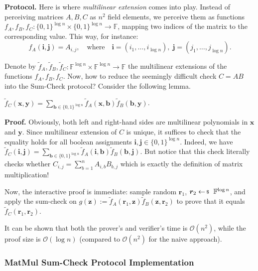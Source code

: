 \documentclass[../../book.tex]{subfiles}
\begin{document}
\textbf{Protocol.} Here is where \textit{multilinear extension} comes into play.
Instead of perceiving matrices $A,B,C$ as $n^2$ field elements, we perceive 
them as functions $f_A, f_B, f_C: \{0,1\}^{\log n} \times \{0,1\}^{\log n} \to \mathbb{F}$,
mapping two indices of the matrix to the corresponding value. This way, for instance:
\begin{equation*}
    f_A(\boldsymbol{i}, \boldsymbol{j}) = A_{i,j}, \quad \text{where} \quad \boldsymbol{i}=(i_1,\dots,i_{\log n}), \; \boldsymbol{j}=(j_1,\dots,j_{\log n}).
\end{equation*}

Denote by $\widetilde{f}_A, \widetilde{f}_B, \widetilde{f}_C: \mathbb{F}^{\log n} \times \mathbb{F}^{\log n} \to \mathbb{F}$ the
multilinear extensions of the functions $f_A, f_B, f_C$. Now, how to 
reduce the seemingly difficult check $C = AB$ into the Sum-Check
protocol? Consider the following lemma.
\begin{lemma}
    $\widetilde{f}_C(\mathbf{x},\mathbf{y}) = \sum_{\boldsymbol{b} \in \{0,1\}^{\log n}} \widetilde{f}_A(\mathbf{x}, \boldsymbol{b})\widetilde{f}_B(\boldsymbol{b}, \mathbf{y})$.
\end{lemma}

\textbf{Proof.} Obviously, both left and right-hand sides are multilinear
polynomials in $\mathbf{x}$ and $\mathbf{y}$. Since multilinear extension of $C$
is unique, it suffices to check that the equality holds for all boolean
assignments $\boldsymbol{i}, \boldsymbol{j} \in \{0,1\}^{\log n}$. Indeed, we
have $\widetilde{f}_C(\boldsymbol{i},\boldsymbol{j}) = \sum_{\boldsymbol{b} \in
\{0,1\}^{\log n}} \widetilde{f}_A(\boldsymbol{i},
\boldsymbol{b})\widetilde{f}_B(\boldsymbol{b}, \boldsymbol{j})$. But notice that
this check literally checks whether $C_{i,j} = \sum_{b=1}^n A_{i,b}B_{b,j}$
which is exactly the definition of matrix multiplication!

Now, the interactive proof is immediate: sample random $\boldsymbol{r}_1$,
$\boldsymbol{r}_2 \leftarrowS \mathbb{F}^{\log n}$, and apply the sum-check
on $g(\mathbf{z}) := \widetilde{f}_A(\boldsymbol{r}_1,
\mathbf{z})\widetilde{f}_B(\mathbf{z}, \boldsymbol{r}_2)$ to prove that it 
equals $\widetilde{f}_C(\boldsymbol{r}_1, \boldsymbol{r}_2)$.

It can be shown that both the prover's and verifier's time is
$\mathcal{O}(n^2)$, while the proof size is $\mathcal{O}(\log n)$ (compared to
$\mathcal{O}(n^2)$ for the naive approach).

\subsubsection{MatMul Sum-Check Protocol Implementation}
\end{document}
